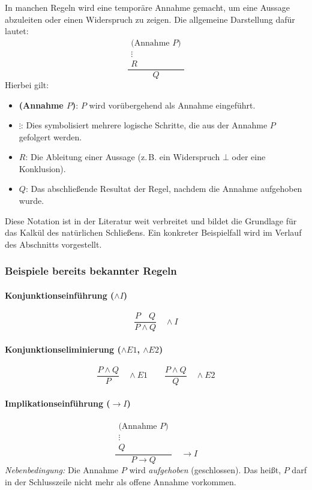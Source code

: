 \documentclass{book}
\theoremstyle{plain}
\theoremstyle{remark}
\theoremstyle{definition}
\begin{document}
In manchen Regeln wird eine temporäre Annahme gemacht, um eine Aussage abzuleiten oder einen Widerspruch zu zeigen. Die allgemeine Darstellung dafür lautet:
\[
\frac{
\begin{array}{c}
\text{(Annahme }P\text{)} \\
\vdots \\
R
\end{array}
}{Q}
\]
Hierbei gilt:
\begin{itemize}
    \item \textbf{(Annahme $P$)}: $P$ wird vorübergehend als Annahme eingeführt.
    \item \textbf{$\vdots$}: Dies symbolisiert mehrere logische Schritte, die aus der Annahme $P$ gefolgert werden.
    \item \textbf{$R$}: Die Ableitung einer Aussage (z.\,B. ein Widerspruch $\bot$ oder eine Konklusion).
    \item \textbf{$Q$}: Das abschließende Resultat der Regel, nachdem die Annahme aufgehoben wurde.
\end{itemize}
Diese Notation ist in der Literatur weit verbreitet und bildet die Grundlage für das Kalkül des natürlichen Schließens. Ein konkreter Beispielfall wird im Verlauf des Abschnitts vorgestellt.

\subsubsection{Beispiele bereits bekannter Regeln}

\paragraph{Konjunktionseinführung ($\land I$)} 
\[
\frac{P \quad Q}{P \land Q}
\quad \land I
\]

\paragraph{Konjunktionseliminierung ($\land E1$, $\land E2$)} 
\[
\frac{P \land Q}{P}
\quad \land E1
\quad\quad
\frac{P \land Q}{Q}
\quad \land E2
\]

\paragraph{Implikationseinführung ($\to I$)}
\[
\frac{
\begin{array}{c}
\text{(Annahme }P\text{)} \\
\vdots \\
Q
\end{array}
}{P \rightarrow Q}
\quad \to I
\]
\emph{Nebenbedingung:} Die Annahme $P$ wird \emph{aufgehoben} (geschlossen). Das heißt, $P$ darf in der Schlusszeile nicht mehr als offene Annahme vorkommen.
\end{document}
